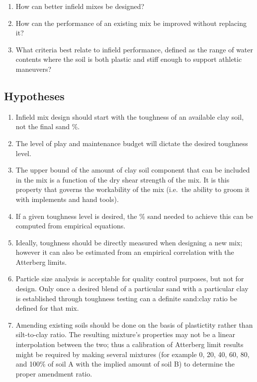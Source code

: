 \documentclass[
  letterpaper,
  openany]{book}
\begin{document}
\begin{enumerate}
\def\labelenumi{\arabic{enumi}.}
\item
  How can better infield mixes be designed?
\item
  How can the performance of an existing mix be improved without replacing it?
\item
  What criteria best relate to infield performance, defined as the range of water contents where the soil is both plastic and stiff enough to support athletic maneuvers?
\end{enumerate}

\hypertarget{hypotheses-4}{%
\subsection{Hypotheses}\label{hypotheses-4}}

\begin{enumerate}
\def\labelenumi{\arabic{enumi}.}
\item
  Infield mix design should start with the toughness of an available clay soil, not the final sand \%.
\item
  The level of play and maintenance budget will dictate the desired toughness level.
\item
  The upper bound of the amount of clay soil component that can be included in the mix is a function of the dry shear strength of the mix. It is this property that governs the workability of the mix (i.e.~the ability to groom it with implements and hand tools).
\item
  If a given toughness level is desired, the \% sand needed to achieve this can be computed from empirical equations.
\item
  Ideally, toughness should be directly measured when designing a new mix; however it can also be estimated from an empirical correlation with the Atterberg limits.
\item
  Particle size analysis is acceptable for quality control purposes, but not for design. Only once a desired blend of a particular sand with a particular clay is established through toughness testing can a definite sand:clay ratio be defined for that mix.
\item
  Amending existing soils should be done on the basis of plastictity rather than silt-to-clay ratio. The resulting mixture's properties may not be a linear interpolation between the two; thus a calibration of Atterberg limit results might be required by making several mixtures (for example 0, 20, 40, 60, 80, and 100\% of soil A with the implied amount of soil B) to determine the proper amendment ratio.
\end{enumerate}
\end{document}
